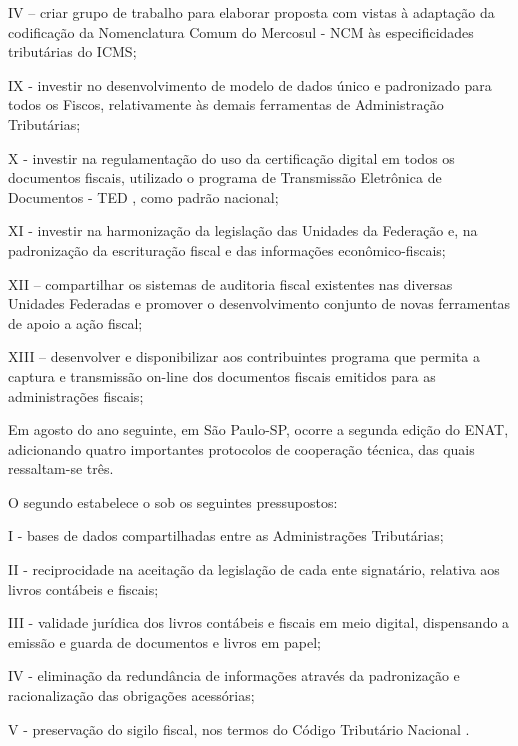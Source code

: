 \begin{citacao}
IV – criar grupo de trabalho para elaborar proposta com vistas à adaptação da codificação
da Nomenclatura Comum do Mercosul - NCM  às especificidades tributárias do ICMS;

IX - investir no desenvolvimento de modelo de dados único e padronizado para todos os
Fiscos, relativamente às demais ferramentas de Administração Tributárias;

X - investir na regulamentação do uso da certificação digital em todos os documentos
fiscais, utilizado o programa de Transmissão Eletrônica de Documentos - TED , como padrão
nacional;

XI - investir na harmonização da legislação das Unidades da Federação e, na
padronização da escrituração fiscal e das informações econômico-fiscais;

XII – compartilhar os sistemas de auditoria fiscal existentes nas diversas Unidades
Federadas e promover o desenvolvimento conjunto de novas ferramentas de apoio a ação fiscal;

XIII – desenvolver e disponibilizar aos contribuintes programa que permita a captura e
transmissão on-line dos documentos fiscais emitidos para as administrações fiscais; 
\end{citacao}

Em agosto do ano seguinte, em São Paulo-SP, ocorre a segunda edição do ENAT, adicionando quatro importantes protocolos de cooperação técnica, das quais ressaltam-se três.

O segundo estabelece o  sob os seguintes pressupostos:

\begin{citacao}
I - bases de dados compartilhadas entre as Administrações Tributárias;

II - reciprocidade na aceitação da legislação de cada ente signatário, relativa aos livros
contábeis e fiscais;

III - validade jurídica dos livros contábeis e fiscais em meio digital, dispensando a
emissão e guarda de documentos e livros em papel;

IV - eliminação da redundância de informações através da padronização e racionalização
das obrigações acessórias;

V - preservação do sigilo fiscal, nos termos do Código Tributário Nacional \cite{enat:2005:protocolo2}. 
\end{citacao}

